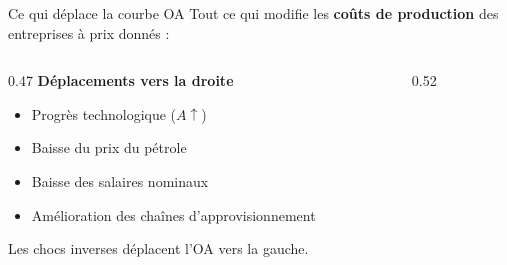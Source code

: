 \documentclass[aspectratio=169]{beamer}
\begin{document}
\begin{frame}[t]{Ce qui déplace la courbe OA}\examtag
   \small
   Tout ce qui modifie les \textbf{coûts de production} des entreprises à prix donnés :
   \vspace{0.5cm}
   \begin{columns}[T]
      \begin{column}{0.47\textwidth}
         \textbf{\textcolor{HECgreen}{Déplacements vers la droite}}
         \vspace{0.15cm}
         \begin{itemize}
            \setlength\itemsep{0.2cm}
            \item Progrès technologique ($A \uparrow$)
            \item Baisse du prix du pétrole
            \item Baisse des salaires nominaux
            \item Amélioration des chaînes d'approvisionnement
         \end{itemize}
         \vspace{0.2cm}
         {\footnotesize\textcolor{HECgray}{Les chocs inverses déplacent l’OA vers la gauche.}}
      \end{column}
      \begin{column}{0.52\textwidth}
         \centering
         \vspace{0.2cm}
      \end{column}
   \end{columns}
\end{frame}
\end{document}

